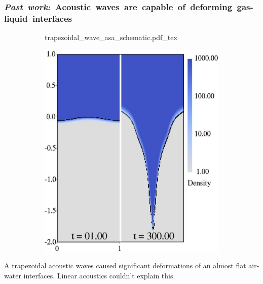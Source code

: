 \begin{frame} \frametitle{\mbox{\textit{Past work:} Acoustic waves are capable of deforming gas-liquid interfaces}}
  \begin{figure}
    \centering
    \begin{subfigure}{0.48\textwidth}
      \def\svgwidth{\textwidth}
      {trapezoidal_wave_asa_schematic.pdf_tex}%
    \end{subfigure}
    \begin{subfigure}{0.48\textwidth}
      \includegraphics[width=\textwidth]{../figs/lung_figs/snapshots_density_t1_t300}
    \end{subfigure}
  \end{figure}
  A trapezoidal acoustic waves caused significant deformations of an
  almost flat air-water interfaces. Linear acoustics couldn't explain
  this.
\end{frame}
